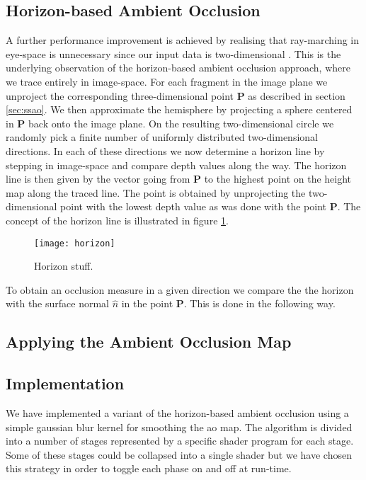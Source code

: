 \subsection{Horizon-based Ambient Occlusion}
\label{sec:hbao}
A further performance improvement is achieved by realising that
ray-marching in eye-space is unnecessary since our input data is
two-dimensional \citep{hbao}. This is the underlying observation of
the horizon-based ambient occlusion approach, where we trace entirely
in image-space. For each fragment in the image plane we unproject the
corresponding three-dimensional point $\mathbf{P}$ as described in
section \ref{sec:ssao}. We then approximate the hemisphere by
projecting a sphere centered in $\mathbf{P}$ back onto the image
plane. On the resulting two-dimensional circle we randomly pick a
finite number of uniformly distributed two-dimensional directions. In
each of these directions we now determine a horizon line by stepping
in image-space and compare depth values along the way. The horizon
line is then given by the vector going from $\mathbf{P}$ to the
highest point on the height map along the traced line. The point is
obtained by unprojecting the two-dimensional point with the lowest
depth value as was done with the point $\mathbf{P}$. The concept of
the horizon line is illustrated in figure \ref{fig:horizon}.
\begin{figure}[h]
  \centering
  \texttt{[image: horizon]}
  \caption{Horizon stuff.}
  \label{fig:horizon}
\end{figure}
To obtain an occlusion measure in a given direction we compare the
the horizon with the surface normal $\hat{n}$ in the point
$\mathbf{P}$. This is done in the following way.

\subsection{Applying the Ambient Occlusion Map}

\subsection{Implementation}

We have implemented a variant of the horizon-based ambient occlusion
using a simple gaussian blur kernel for smoothing the ao map.  The
algorithm is divided into a number of stages represented by a specific
shader program for each stage. Some of these stages could be collapsed
into a single shader but we have chosen this strategy in order to
toggle each phase on and off at run-time.

